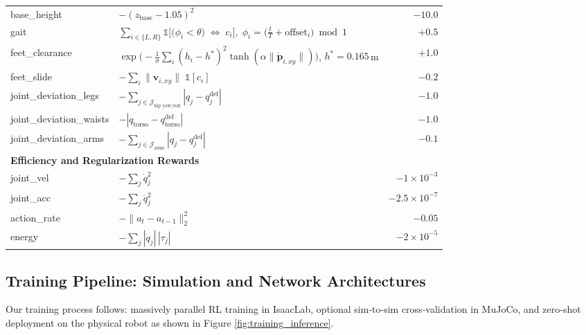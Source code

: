 \begin{table}[H]
{\begin{tabularx}{\textwidth}{l X r}
base\_height &
$\displaystyle -(z_{\text{base}}-1.05)^2$ &
$-10.0$ \\

gait &
$\displaystyle \sum_{i\in\{L,R\}}\mathbb{1}\!\Big[\big(\phi_i<\theta\big)\;\Leftrightarrow\;c_i\Big],\;
\phi_i=\big(\tfrac{t}{T}+\text{offset}_i\big)\bmod 1$ &
$+0.5$ \\

feet\_clearance &
$\displaystyle \exp\!\Big(-\tfrac{1}{\sigma}\sum_i (h_i-h^*)^2 \tanh(\alpha \|\dot{\mathbf{p}}_{i,xy}\|)\Big)$,
$h^*=0.165$\,m &
$+1.0$ \\

feet\_slide &
$\displaystyle -\sum_i \|\mathbf{v}_{i,xy}\|\;\mathbb{1}[c_i]$ &
$-0.2$ \\

joint\_deviation\_legs &
$\displaystyle -\sum_{j\in\mathcal{J}_{\text{hip yaw/roll}}}|q_j-q^{\text{def}}_j|$ &
$-1.0$ \\

joint\_deviation\_waists &
$\displaystyle -|q_{\text{torso}}-q^{\text{def}}_{\text{torso}}|$ &
$-1.0$ \\

joint\_deviation\_arms &
$\displaystyle -\sum_{j\in\mathcal{J}_{\text{arms}}}|q_j-q^{\text{def}}_j|$ &
$-0.1$ \\

\toprule\toprule
\multicolumn{3}{l}{\textbf{Efficiency and Regularization Rewards}} \\
\midrule
joint\_vel &
$\displaystyle -\sum_j \dot q_j^2$ &
$-1\times 10^{-3}$ \\

joint\_acc &
$\displaystyle -\sum_j \ddot q_j^2$ &
$-2.5\times 10^{-7}$ \\

action\_rate &
$\displaystyle -\|a_t-a_{t-1}\|_2^2$ &
$-0.05$ \\

energy &
$\displaystyle -\sum_j |\dot q_j|\,|\tau_j|$ &
$-2\times 10^{-5}$ \\
\bottomrule
\end{tabularx}
}
\label{tab:reward_terms}
\end{table}


\subsection{Training Pipeline: Simulation and Network Architectures}
\label{sec:problem_setup}

Our training process follows: massively parallel RL training in IsaacLab, optional sim‑to‑sim cross‑validation in MuJoCo, and zero‑shot deployment on the physical robot as shown in Figure \ref{fig:training_inference}. 



